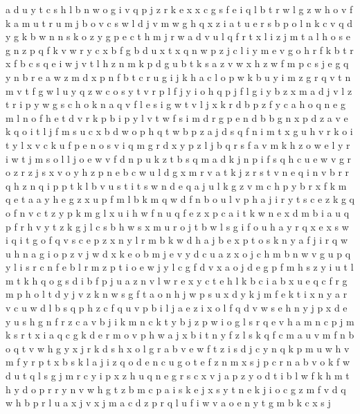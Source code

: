\documentclass{article}
\begin{document}
a d u y t c s h l b n w o g i v q p j z r k e x
x c g s f e i q l b t
r w l
g z w h o v f k a m u t r
u m j
b o v c s w l
d j v m w g h q x z i a t u e r s b p o l n k c
v q d y g k b w n
n s k o z y g p e c t h m j r w a d v u l q f
r t x l i z
j m t a l h o s e g n z p q f k v w r y c x b
f g b d u x t
x q n w p z j c l i y m e v g o h r f k b t
r x f b c s q e i w j v t l h z n m k p d g u
b t
k
s a z v w
x h z w f m p c s j e g q y n b r
e a w z m d x p n f b t c r u g i j k
h a c l o p w k b u y i m z g r q v t n
m v t f g w l u y
q z
w c o s y t v r
p l f j y i
o h q p j f l g i y b z x m a
d j v l z t r i p y w g s c h o k n a q
v f
l e
s i g w t v l j x k r d b p z f y c a h o q n e
g m l n o f h e t d v r k p b i
p y l v t w f s i m
d r
g p e n d b
b g n x p d z a v e k q o i t l j f m s u c
x b d w o p h q t
w b p z a j d s q f n i m t x g u h v r k o
i t y l x v c k u f p e n
o s v i q m g r d x y p z l j b
q r s f a v m k h z o w e l
y r i w t j m s
o l
l j o e w v f d n p u k z t b s q m
a d k j n p i f s q h c u e w v g r o z
r z j s x v o
y h z p n e b c w u l d g x m r v a t k j
z r s t v n e q
i n v b r
r q h z
n q i p
p t
k l b v u s t
i t s w n d e q a j u l k g z v m c h p y b r x f
k m q e t a
a y h e g z x u p f m l b k
m q w d f n b o u l v p h a j i r y t s c e z k g
q o f n v c t z y p k m g l x u i h w
f
n u q f e z x p c a i t k
w n e x d m b i a u q p f r h v y t z k g j l c s
b h w s x m u r o j
t b w l s g i f o u h a y r q x e
x s w i q
i t g o f q v s c e p z x n y l r m b k w d h a j
b e x p t o s k n y a f j i r q w u h
n a g i o p z v j w d x k e
o b m j e v y d c u
a z x o j c h m b n w v g u p q y l i s r
c n f e b l r
m z p t i o e w j y l c g f d v x
a o j d e g p f m h s z y i u t l
m t k h q o g s d i b f p j u a z n v l w r e x y c
t e h l k b c
i a b x u e q c f r g m p h o l t d y j v z k n w s
g f t a o n h j w p s u x d y k
j m f e k t i x n y a r v c u w d l b s q p h z
c f q u v p b i
l j a e z
i x o l f q d v w s e h n y j
p x d e y u s h g n f r z c a v b j i k m
n c
k t y b j z p w i o g l s r q e v h a m n c
p j m k s r t x i a
q c g k d e r m o v p h w a j x b i t n y f z l s
k q f c m a u v
m f n b o q t v w h g y x j r k d s
h x o l g r a b v e w f t z i s d j c y n q k p m u
w h v m f y r p t x b s k l a j i z q o d e n c u g
o t e f z n m x s j p c r
n a b v o k f w d u t q l s g j m r c y i p x z h
u q n e g r s c x v j a p z y o d t i b l w f k h m
t h y d o p r
r y n v w h g t z b m c p a i s k e j x
s y t n e k j i o c g z m f v d q w h b p r l u a x
j
v x j m a c
d z p r q l u f i w v a o e n y t g m b k c x s j
\end{document}
